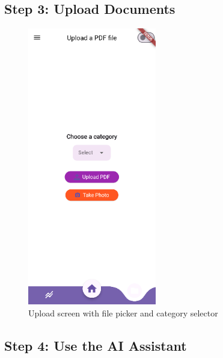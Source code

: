 \subsection*{Step 3: Upload Documents}

\begin{figure}[H]
    \centering
    \includegraphics[width=0.5\textwidth]{frontend/upload_contract.png}
    \caption{Upload screen with file picker and category selector}
\end{figure}

\subsection*{Step 4: Use the AI Assistant}

